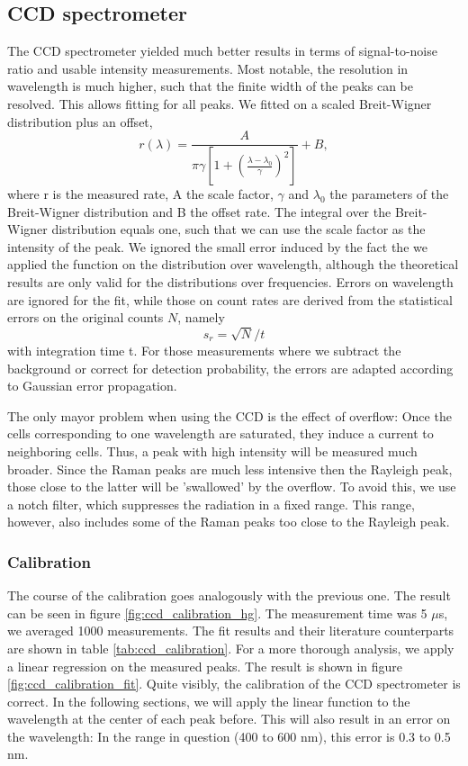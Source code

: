 \subsection{CCD spectrometer}
The CCD spectrometer yielded much better results in terms of signal-to-noise ratio and usable intensity measurements. 
Most notable, the resolution in wavelength is much higher, such that the finite width of the peaks can be resolved.
This allows fitting for all peaks. We fitted on a scaled Breit-Wigner distribution plus an offset, 
\begin{equation}
    r(\lambda) = \frac{A}{\pi \gamma \left[1 + \left(\frac{\lambda - \lambda_0}{\gamma}\right)^2\right]} + B, 
\end{equation} 
where r is the measured rate, A the scale factor, $\gamma$ and $\lambda_0$ the parameters of the Breit-Wigner 
distribution and B the offset rate. The integral over the Breit-Wigner distribution equals one, such that we can use the 
scale factor as the intensity of the peak. 
We ignored the small error induced by the fact the we applied the function on the distribution over wavelength, although 
the theoretical results are only valid for the distributions over frequencies. Errors on wavelength are ignored 
for the fit, while those on count rates are derived from the statistical errors on the original counts $N$, namely 
\begin{equation}
    s_r = \sqrt{N} / t
\end{equation}
with integration time t. For those measurements where we subtract the background or correct for detection probability, 
the errors are adapted according to Gaussian error propagation. 

The only mayor problem when using the CCD is the effect of overflow: Once the cells corresponding to one wavelength 
are saturated, they induce a current to neighboring cells. Thus, a peak with high intensity will be measured much 
broader. Since the Raman peaks are much less intensive then the Rayleigh peak, those close to the latter will be 
'swallowed' by the overflow. To avoid this, we use a notch filter, which suppresses the radiation in a fixed range.
This range, however, also includes some of the Raman peaks too close to the Rayleigh peak. 

\subsubsection{Calibration}
The course of the calibration goes analogously with the previous one. The result can be seen in figure 
\ref{fig:ccd_calibration_hg}. The measurement time was 5 $\mu$s, we averaged 1000 measurements. 
The fit results and their literature counterparts are shown in table \ref{tab:ccd_calibration}.  
For a more thorough analysis, we apply a linear regression on the measured peaks. The result is shown in 
figure \ref{fig:ccd_calibration_fit}. Quite visibly, the calibration of the CCD spectrometer is correct. 
In the following sections, we will apply the linear function to the wavelength at the center of each peak before. 
This will also result in an error on the wavelength: In the range in question (400 to 600 nm), this error is 
0.3 to 0.5 nm. 

